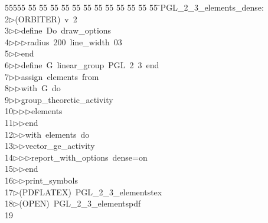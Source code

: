 %
%
\begin{tabbing}
55555 \= 55 \= 55 \= 55 \= 55 \= 55 \= 55 \= 55 \= 55 \= 55 \= 55 \= 55 \= 55 \= \>PGL\_2\_3\_elements\_dense:\\[0pt]
2\>$\triangleright$\>(ORBITER)\ v\ 2\ \\[0pt]
3\>$\triangleright$\>$\triangleright$\>define\ Do\ draw\_options\ \\[0pt]
4\>$\triangleright$\>$\triangleright$\>$\triangleright$\>radius\ 200\ line\_width\ 03\ \\[0pt]
5\>$\triangleright$\>$\triangleright$\>end\ \\[0pt]
6\>$\triangleright$\>$\triangleright$\>define\ G\ linear\_group\ PGL\ 2\ 3\ end\ \\[0pt]
7\>$\triangleright$\>$\triangleright$\>assign\ elements\ from\ \\[0pt]
8\>$\triangleright$\>$\triangleright$\>with\ G\ do\ \\[0pt]
9\>$\triangleright$\>$\triangleright$\>group\_theoretic\_activity\ \\[0pt]
10\>$\triangleright$\>$\triangleright$\>$\triangleright$\>elements\ \\[0pt]
11\>$\triangleright$\>$\triangleright$\>end\ \\[0pt]
12\>$\triangleright$\>$\triangleright$\>with\ elements\ do\ \\[0pt]
13\>$\triangleright$\>$\triangleright$\>vector\_ge\_activity\ \\[0pt]
14\>$\triangleright$\>$\triangleright$\>$\triangleright$\>report\_with\_options\ dense=on\ \\[0pt]
15\>$\triangleright$\>$\triangleright$\>end\ \\[0pt]
16\>$\triangleright$\>$\triangleright$\>print\_symbols\\[0pt]
17\>$\triangleright$\>(PDFLATEX)\ PGL\_2\_3\_elementstex\\[0pt]
18\>$\triangleright$\>(OPEN)\ PGL\_2\_3\_elementspdf\\[0pt]
19\>\end{tabbing}
